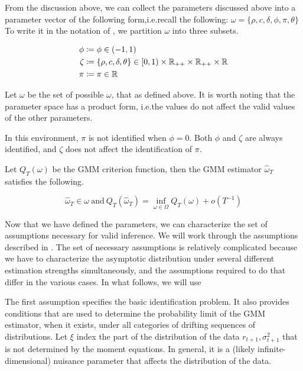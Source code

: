 \documentclass[11pt, letterpaper, twoside, final]{article}
\begin{document}
From the discussion above, we can collect the parameters discussed above into a parameter vector of the following
form,i.e.\@ recall the following: $\omega = \lbrace \rho, c, \delta, \phi, \pi, \theta \rbrace$
To write it in the notation of \textcite{andrews2014Gmm}, we partition $\omega$ into three subsets.

\begin{align}
    \phi &\coloneqq \phi  \in (-1, 1) \\ 
    \zeta &\coloneqq \lbrace \rho, c, \delta, \theta \rbrace \in [0,1) \times \mathbb{R}_{++} \times \mathbb{R}_{++} \times
    \mathbb{R}  \\
    \pi &\coloneqq \pi \in \mathbb{R}
\end{align}

Let $\omega$ be the set of possible $\omega$, that as defined above.
It is worth noting that the parameter space has a product form, i.e.\@ the values do not affect the valid values
of the other parameters.

In this environment, $\pi$ is not identified when $\phi = 0$.
Both $\phi$ and $\zeta$ are always identified, and $\zeta$ does not affect the identification of $\pi$.

Let $Q_T(\omega)$ be the GMM criterion function, then the GMM estimator $\hat{\omega}_T$ satisfies the following.


\begin{equation}
    \widehat{\omega}_T \in \omega\ \text{and}\ Q_T(\hat{\omega}_T) = \inf_{\omega \in \Omega} Q_T(\omega) +
    o\left(T^{-1}\right) 
\end{equation}


Now that we have defined the parameters, we can characterize the set of assumptions necessary for valid inference.
We will work through the assumptions described in \textcite{andrews2014Gmm}.
The set of necessary assumptions is relatively complicated because we have to characterize the asymptotic
distribution under several different estimation strengths simultaneously, and the assumptions required to do that
  differ in the various cases. 
In what follows, we will use 

The first assumption specifies the basic identification
problem. It also provides conditions that are used to determine the
probability limit of the GMM estimator, when it exists, under all categories
of drifting sequences of distributions.
Let $\xi$ index the part of the distribution of the data $r_{t+1}, \sigma^2_{t+1}$ that is not determined by the
moment equations.
In general, it is a (likely infinite-dimensional) nuisance parameter that affects the distribution of the data. 
\end{document}
